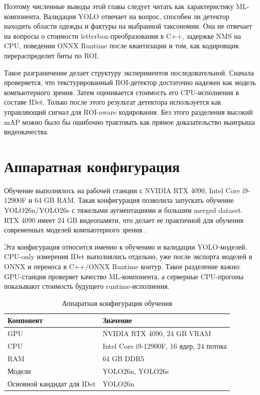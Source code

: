\documentclass[12pt,a4paper,oneside,openany]{report}
\begin{document}
Поэтому численные выводы этой главы следует читать как характеристику ML-компонента. Валидация
YOLO отвечает на вопрос, способен ли детектор находить области одежды и фактуры на выбранной
таксономии. Она не отвечает на вопросы о стоимости letterbox-преобразования в C++, задержке NMS
на CPU, поведении ONNX Runtime после квантизации и том, как кодировщик перераспределит биты по
ROI.

Такое разграничение делает структуру экспериментов последовательной. Сначала проверяется, что
текстурированный ROI-детектор достаточно надежен как модель компьютерного зрения. Затем
оценивается стоимость его CPU-исполнения в составе IDet. Только после этого результат детектора
используется как управляющий сигнал для ROI-aware кодирования. Без этого разделения высокий mAP
можно было бы ошибочно трактовать как прямое доказательство выигрыша видеокачества.


\section{Аппаратная конфигурация}

Обучение выполнялось на рабочей станции с NVIDIA RTX 4090, Intel Core i9-12900F и 64 GB RAM.
Такая конфигурация позволила запускать обучение YOLO26n/YOLO26s с тяжелыми аугментациями и
большим merged dataset. RTX 4090 имеет 24 GB видеопамяти, что делает ее практичной для обучения
современных моделей компьютерного зрения \cite{nvidia4090}.

Эта конфигурация относится именно к обучению и валидации YOLO-моделей. CPU-only измерения IDet
выполнялись отдельно, уже после экспорта моделей в ONNX и переноса в C++/ONNX Runtime контур.
Такое разделение важно: GPU-станция проверяет качество ML-компонента, а серверные CPU-прогоны
показывают стоимость будущего runtime-исполнения.

\begin{table}[!htbp]
  \centering
  \caption{Аппаратная конфигурация обучения}
  \label{tab:hardware}
  \begin{tabularx}{\linewidth}{@{}Y Y@{}}
    \toprule
    Компонент & Значение \\
    \midrule
    GPU & NVIDIA RTX 4090, 24 GB VRAM \\
    CPU & Intel Core i9-12900F, 16 ядер, 24 потока \\
    RAM & 64 GB DDR5 \\
    Модели & YOLO26n, YOLO26s \\
    Основной кандидат для IDet & YOLO26n \\
    \bottomrule
  \end{tabularx}
\end{table}
\end{document}
